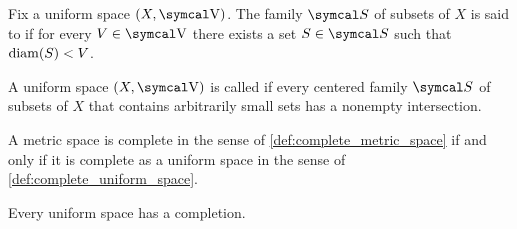 \begin{definition}\label{def:uniform_space_arbitrarily_small_sets}\cite[446]{Engelking1989}
  Fix a uniform space \( (X, \CV) \). The family \( \Cal{S} \) of subsets of \( X \) is said to  if for every \( V \in \CV \) there exists a set \( S \in \Cal{S} \) such that \( \operatorname{diam}(S) < V \).
\end{definition}

\begin{definition}\label{def:complete_uniform_space}\cite[446]{Engelking1989}
  A uniform space \( (X, \CV) \) is called  if every centered family \( \Cal{S} \) of subsets of \( X \) that contains arbitrarily small sets has a nonempty intersection.
\end{definition}

\begin{proposition}\label{thm:uniform_space_complete_iff_metric_space_complete}
  A metric space is complete in the sense of \cref{def:complete_metric_space} if and only if it is complete as a uniform space in the sense of \cref{def:complete_uniform_space}.
\end{proposition}

\begin{theorem}\label{thm:uniform_space_completion_existence}\cite[theorem 8.3.12]{Engelking1989}
  Every uniform space has a completion.
\end{theorem}

